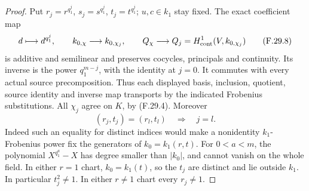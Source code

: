 \begin{proof}
Put $r_j=r^{q_1^j}$, $s_j=s^{q_1^j}$,
$t_j=t^{q_1^j}$; $u,c\in k_1$ stay fixed.
The exact coefficient map
\[
 d\longmapsto d^{q_1^j},\qquad
 k_{0,\chi}\longrightarrow k_{0,\chi_j},\qquad
 Q_\chi\longrightarrow Q_j=H^1_{\rm cont}(V,k_{0,\chi_j})
                                                               \tag{F.29.8}
\]
is additive and semilinear and preserves cocycles,
principals and continuity. Its inverse is the
power $q_1^{m-j}$, with the identity at $j=0$.
It commutes with every actual source precomposition.
Thus each displayed basis, inclusion, quotient,
source identity and inverse map transports by
the indicated Frobenius substitutions.
All $\chi_j$ agree on $K$, by (F.29.4).
Moreover
\[
                     (r_j,t_j)=(r_l,t_l)\quad\Longrightarrow\quad j=l.
                                                               \tag{F.29.9}
\]
Indeed such an equality for distinct indices
would make a nonidentity $k_1$-Frobenius power
fix the generators of $k_0=k_1(r,t)$.
For $0<a<m$, the polynomial $X^{q_1^a}-X$ has
degree smaller than $|k_0|$, and cannot vanish
on the whole field. In either $r=1$ chart,
$k_0=k_1(t)$, so the $t_j$ are distinct and
lie outside $k_1$. In particular $t_j^2\ne1$.
In either $r\ne1$ chart every $r_j\ne1$.


\end{proof}
